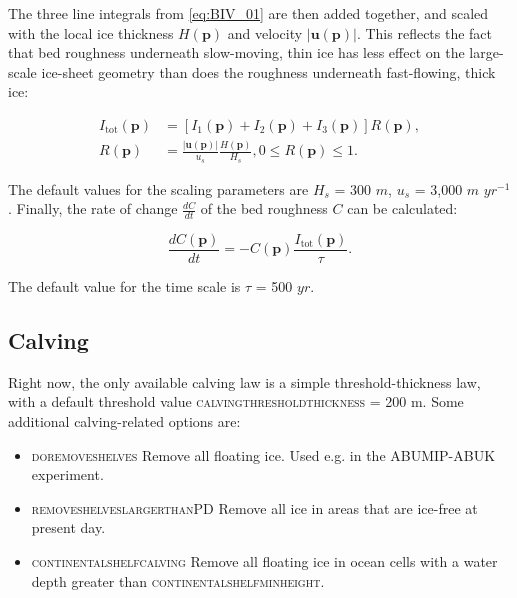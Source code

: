 \documentclass{article}
\begin{document}
The three line integrals from \eqref{eq:BIV_01} are then added together, and scaled with the local ice thickness $H \left( \textbf{p} \right)$ and velocity $\left| \textbf{u} \left( \textbf{p} \right) \right|$. This reflects the fact that bed roughness underneath slow-moving, thin ice has less effect on the large-scale ice-sheet geometry than does the roughness underneath fast-flowing, thick ice:

\begin{align}
I_{\textrm{tot}} \left( \textbf{p} \right) &= \left[
I_1 \left( \textbf{p} \right) + I_2 \left( \textbf{p} \right) + I_3 \left( \textbf{p} \right)
\right] R \left( \textbf{p} \right), \\
R \left( \textbf{p} \right) &=
\frac{ \left| \textbf{u} \left( \textbf{p} \right) \right| }{u_s}
\frac{ H \left( \textbf{p} \right) }{H_s}, 0 \leq R \left( \textbf{p} \right) \leq 1.
\end{align}

The default values for the scaling parameters are $H_s$ = 300 $m$, $u_s$ = 3,000 $m$ $yr^{-1}$. Finally, the rate of change $\frac{dC}{dt}$ of the bed roughness $C$ can be calculated:

\begin{equation}
\frac{ dC \left( \textbf{p} \right) }{dt} = -C \left( \textbf{p} \right) \frac{I_{\textrm{tot}} \left( \textbf{p} \right)}{\tau}.
\end{equation}

The default value for the time scale is $\tau$ = 500 $yr$.

\newpage
\subsection{Calving}

Right now, the only available calving law is a simple threshold-thickness law, with a default threshold value \textsc{calving\textunderscore threshold\textunderscore thickness} = 200 m. Some additional calving-related options are:

\begin{itemize}
\item \textsc{do\textunderscore remove\textunderscore shelves} Remove all floating ice. Used e.g. in the ABUMIP-ABUK experiment.
\item \textsc{remove\textunderscore shelves\textunderscore larger\textunderscore than\textunderscore PD} Remove all ice in areas that are ice-free at present day.
\item \textsc{continental\textunderscore shelf\textunderscore calving} Remove all floating ice in ocean cells with a water depth greater than \textsc{continental\textunderscore shelf\textunderscore min\textunderscore height}.
\end{itemize}
\end{document}
